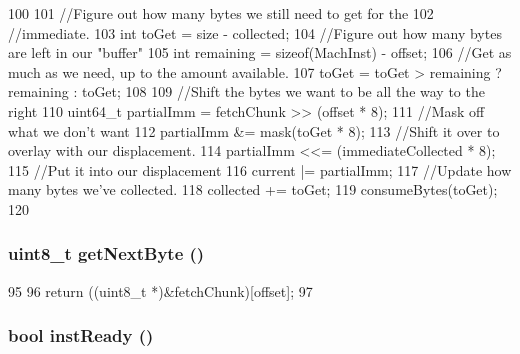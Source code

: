 \begin{DoxyCode}
100     {
101         //Figure out how many bytes we still need to get for the
102         //immediate.
103         int toGet = size - collected;
104         //Figure out how many bytes are left in our "buffer"
105         int remaining = sizeof(MachInst) - offset;
106         //Get as much as we need, up to the amount available.
107         toGet = toGet > remaining ? remaining : toGet;
108 
109         //Shift the bytes we want to be all the way to the right
110         uint64_t partialImm = fetchChunk >> (offset * 8);
111         //Mask off what we don't want
112         partialImm &= mask(toGet * 8);
113         //Shift it over to overlay with our displacement.
114         partialImm <<= (immediateCollected * 8);
115         //Put it into our displacement
116         current |= partialImm;
117         //Update how many bytes we've collected.
118         collected += toGet;
119         consumeBytes(toGet);
120     }
\end{DoxyCode}
\hypertarget{classX86ISA_1_1Decoder_a8f47335339a66b8928a59b6e450ba23e}{
\subsubsection[{getNextByte}]{\setlength{\rightskip}{0pt plus 5cm}uint8\_\-t getNextByte ()}}
\label{classX86ISA_1_1Decoder_a8f47335339a66b8928a59b6e450ba23e}



\begin{DoxyCode}
95     {
96         return ((uint8_t *)&fetchChunk)[offset];
97     }
\end{DoxyCode}
\hypertarget{classX86ISA_1_1Decoder_a9f6a0bc8946ca58d5d59a5dbc6a3181f}{
\subsubsection[{instReady}]{\setlength{\rightskip}{0pt plus 5cm}bool instReady ()}}
\label{classX86ISA_1_1Decoder_a9f6a0bc8946ca58d5d59a5dbc6a3181f}



